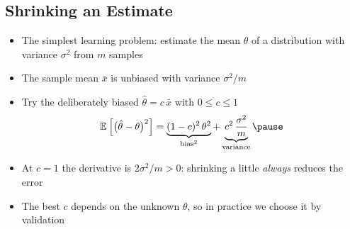 \Outline %

\begin{slide}
\section[-1]{Shrinking an Estimate}

\begin{PauseHighLight}
  \begin{itemize}
  \item The simplest learning problem: estimate the mean $\theta$ of a
    distribution with variance $\sigma^2$ from $m$ samples\pause
  \item The sample mean $\bar{x}$ is unbiased with variance
    $\sigma^2/m$\pause
  \item Try the deliberately biased $\hat{\theta} = c\,\bar{x}$ with
    $0\leq c\leq1$
    \begin{align*}
      \av{\bigl(\hat{\theta}-\theta\bigr)^2} =
      \underbrace{(1-c)^2\,\theta^2}_{\text{bias}^2} +
      \underbrace{c^2\,\frac{\sigma^2}{m}}_{\text{variance}}\pause
    \end{align*}
  \item At $c=1$ the derivative is $2\sigma^2/m>0$: shrinking a
    little \emph{always} reduces the error\pause
  \item The best $c$ depends on the unknown $\theta$, so in practice we
    choose it by validation\pause
  \end{itemize}
\end{PauseHighLight}

\end{slide}


